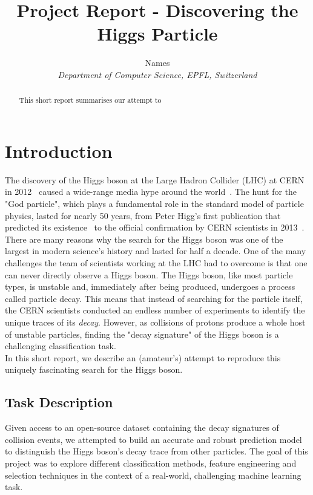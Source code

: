 \documentclass[10pt,conference,compsocconf]{IEEEtran}
\begin{document}
\title{Project Report - Discovering the Higgs Particle}

\author{
  Names\\
  \textit{Department of Computer Science, EPFL, Switzerland}
}

\maketitle

\begin{abstract}
This short report summarises our attempt to 
\end{abstract}


\section{Introduction}

The discovery of the Higgs boson at the Large Hadron Collider (LHC) at CERN in 2012~\cite{Aad2012} caused a wide-range media hype around the world~\cite{Guardian}. The hunt for the "God particle", which plays a fundamental role in the standard model of particle physics, lasted for nearly 50 years, from Peter Higg's first publication that predicted its existence~\cite{Higgs1964} to the official confirmation by CERN scientists in 2013~\cite{CERN}.\\
There are many reasons why the search for the Higgs boson was one of the largest in modern science's history and lasted for half a decade. One of the many challenges the team of scientists working at the LHC had to overcome is that one can never directly observe a Higgs boson. The Higgs boson, like most particle types, is unstable and, immediately after being produced, undergoes a process called particle decay. This means that instead of searching for the particle itself, the CERN scientists conducted an endless number of experiments to identify the unique traces of its \emph{decay}. However, as collisions of protons produce a whole host of unstable particles, finding the "decay signature" of the Higgs boson is a challenging classification task.\\
In this short report, we describe an (amateur's) attempt to reproduce this uniquely fascinating search for the Higgs boson. 

\subsection{Task Description}
Given access to an open-source dataset containing the decay signatures of collision events, we attempted to build an accurate and robust prediction model to distinguish the Higgs boson's decay trace from other particles. The goal of this project was to explore different classification methods, feature engineering and selection techniques in the context of a real-world, challenging machine learning task. 
\end{document}
